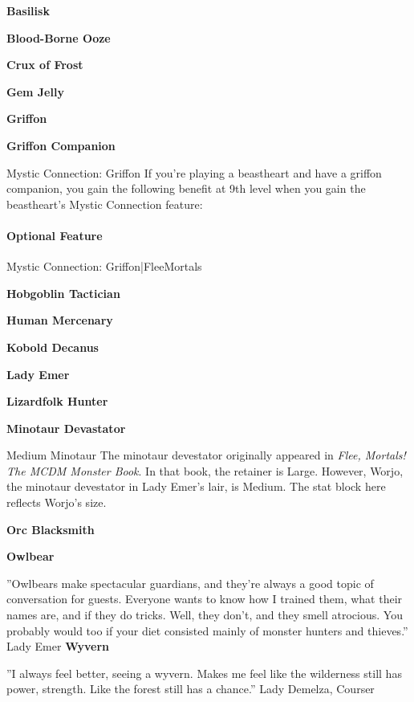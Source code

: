 \documentclass[10pt,a4paper,twoside,bg=print,twocolumn,openany,nodeprecatedcode]{dndbook}
\begin{document}
\textbf{Basilisk}

\textbf{Blood-Borne Ooze}

\textbf{Crux of Frost}

\textbf{Gem Jelly}

\textbf{Griffon}

\textbf{Griffon Companion}

\begin{DndSidebar}[float=!b]{Mystic Connection: Griffon}
If you're playing a beastheart and have a griffon companion, you gain the following benefit at 9th level when you gain the beastheart's Mystic Connection feature:



\paragraph{Optional Feature}
Mystic Connection: Griffon|FleeMortals



\end{DndSidebar}

\textbf{Hobgoblin Tactician}

\textbf{Human Mercenary}

\textbf{Kobold Decanus}

\textbf{Lady Emer}

\textbf{Lizardfolk Hunter}

\textbf{Minotaur Devastator}

\begin{DndSidebar}[float=!b]{Medium Minotaur}
The minotaur devestator originally appeared in \textit{Flee, Mortals! The MCDM Monster Book}. In that book, the retainer is Large. However, Worjo, the minotaur devestator in Lady Emer's lair, is Medium. The stat block here reflects Worjo's size.



\end{DndSidebar}

\textbf{Orc Blacksmith}

\textbf{Owlbear}

\DndQuote%
{}
{''Owlbears make spectacular guardians, and they're always a good topic of conversation for guests. Everyone wants to know how I trained them, what their names are, and if they do tricks. Well, they don't, and they smell atrocious. You probably would too if your diet consisted mainly of monster hunters and thieves.''}
{Lady Emer}
\textbf{Wyvern}

\DndQuote%
{}
{''I always feel better, seeing a wyvern. Makes me feel like the wilderness still has power, strength. Like the forest still has a chance.''}
{Lady Demelza, Courser}
\end{document}
